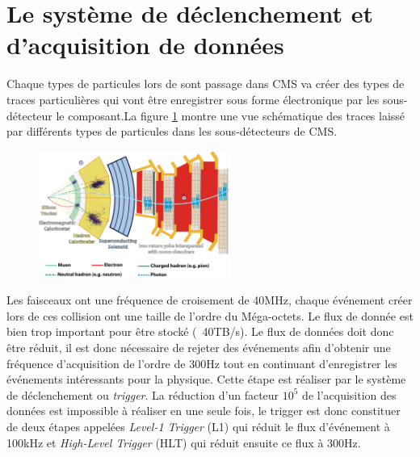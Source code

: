 \section{Le système de déclenchement et d'acquisition de données}
Chaque types de particules lors de sont passage dans CMS va créer des types de traces particulières qui vont être enregistrer sous forme électronique par les sous-détecteur le composant.La figure \ref{particules} montre une vue schématique des traces laissé par différents types de particules dans les sous-détecteurs de CMS.

	  \begin{figure}[ht!]
	\centering
	\includegraphics[width=0.56\textwidth]{CMS/particles.png}
	\label{particules}
\end{figure}

Les faisceaux ont une fréquence de croisement de 40MHz, chaque événement créer lors de ces collision ont une taille de l'ordre du Méga-octets. Le flux de donnée est bien trop important pour être stocké (~40TB/s). Le flux de données doit donc être réduit, il est donc nécessaire de rejeter des événements afin d'obtenir une fréquence d'acquisition de l'ordre de 300Hz tout en continuant d'enregistrer les événements intéressants pour la physique. Cette étape est réaliser par le système de déclenchement ou \textit{trigger}. La réduction d'un facteur $10^{5}$ de l'acquisition des données est impossible à réaliser en une seule fois, le trigger est donc constituer de deux étapes appelées \textit{Level-1 Trigger} (L1) qui réduit le flux d'événement à 100kHz et \textit{High-Level Trigger} (HLT) qui réduit ensuite ce flux à 300Hz.

